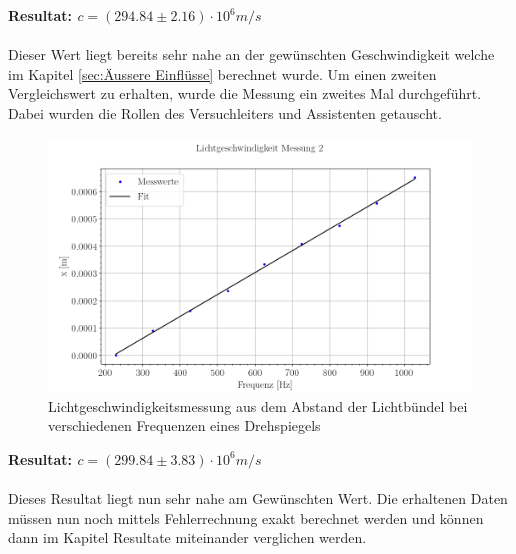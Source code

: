 \textbf{Resultat: $c = (294.84 \pm 2.16) \cdot 10^6 m/s$}\\
\\
Dieser Wert liegt bereits sehr nahe an der gewünschten Geschwindigkeit welche im Kapitel \ref{sec:Äussere Einflüsse} berechnet wurde. Um einen zweiten Vergleichswert zu erhalten, wurde die Messung ein zweites Mal durchgeführt. Dabei wurden die Rollen des Versuchleiters und Assistenten getauscht.
\clearpage

\begin{figure}[ht]
\includegraphics[width=\textwidth]{graphics/messung_2.png}
\caption{Lichtgeschwindigkeitsmessung aus dem Abstand der Lichtbündel bei verschiedenen Frequenzen eines Drehspiegels} %
\label{fig:pol1}
\end{figure}
\textbf{Resultat: $c = (299.84 \pm 3.83) \cdot 10^6 m/s$}\\
\\
Dieses Resultat liegt nun sehr nahe am Gewünschten Wert. Die erhaltenen Daten müssen nun noch mittels Fehlerrechnung exakt berechnet werden und können dann im Kapitel Resultate miteinander verglichen werden.
